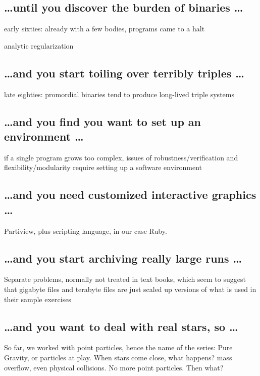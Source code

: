 \documentclass{book}
\begin{document}
\subsection{\dots until you discover the burden of binaries \dots}

early sixties: already with a few bodies, programs came to a halt

analytic regularization

\subsection{\dots and you start toiling over terribly triples \dots}

late eighties: promordial binaries tend to produce long-lived triple systems 

\subsection{\dots and you find you want to set up an environment \dots}

if a single program grows too complex, issues of robustness/verification
and flexibility/modularity require setting up a software environment

\subsection{\dots and you need customized interactive graphics \dots}

Partiview, plus scripting language, in our case Ruby.

\subsection{\dots and you start archiving really large runs \dots}

Separate problems, normally not treated in text books, which seem to suggest
that gigabyte files and terabyte files are just scaled up versions of what 
is used in their sample exercises

\subsection{\dots and you want to deal with real stars, so \dots}

So far, we worked with point particles, hence the name of the series:
Pure Gravity, or particles at play.  When stars come close, what happens?
mass overflow, even physical collisions.  No more point particles.
Then what?
\end{document}
